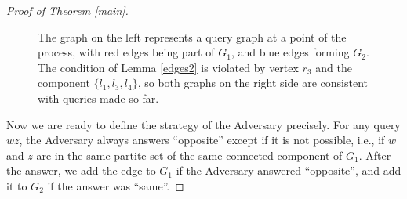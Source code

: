 \documentclass[12pt,a4paper]{amsart}
\theoremstyle{plain}
\theoremstyle{definition}
\begin{document}
\begin{proof}[Proof of Theorem \ref{main}]
\begin{figure}
\begin{minipage}{0.5\textwidth}
\begin{center}
    
    \vspace{5 mm}
    
    \end{center}
     \end{minipage}
        \caption{The graph on the left represents a query graph at a point of the process, with red edges being part of $G_1$, and blue edges forming $G_2$. The condition of Lemma \ref{edges2} is violated by vertex $r_3$ and the component $\{l_1,l_3,l_4\}$, so both graphs on the right side are consistent with queries made so far.}
        \label{fig:mainthm}
    \end{figure}

    Now we are ready to define the strategy of the Adversary precisely. For any query $wz$, the Adversary always answers ``opposite'' except if it is not possible, i.e., if $w$ and $z$ are in the same partite set of the same connected component of $G_1$. After the answer, we add the edge to $G_1$ if the Adversary answered ``opposite'', and add it to $G_2$ if the answer was ``same''. 


\end{proof}
\end{document}
